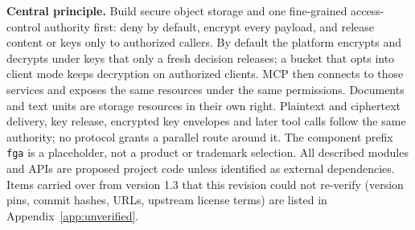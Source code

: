 \documentclass[11pt,a4paper]{article}
\begin{document}
\begin{titlepage}
\vspace{8mm}
\textbf{Central principle.} Build secure object storage and one fine-grained access-control authority first: deny by default, encrypt every payload, and release content or keys only to authorized callers. By default the platform encrypts and decrypts under keys that only a fresh decision releases; a bucket that opts into client mode keeps decryption on authorized clients. MCP then connects to those services and exposes the same resources under the same permissions. Documents and text units are storage resources in their own right. Plaintext and ciphertext delivery, key release, encrypted key envelopes and later tool calls follow the same authority; no protocol grants a parallel route around it.
\vfill
The component prefix \texttt{fga} is a placeholder, not a product or trademark selection. All described modules and APIs are proposed project code unless identified as external dependencies. Items carried over from version 1.3 that this revision could not re-verify (version pins, commit hashes, URLs, upstream license terms) are listed in Appendix~\ref{app:unverified}.
\end{titlepage}
\clearpage{}

\setcounter{section}{-1}








\appendix






\end{document}
